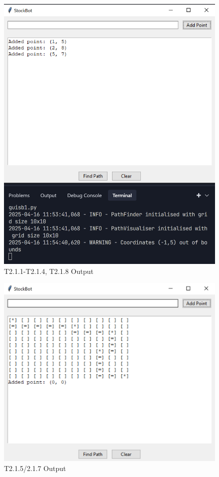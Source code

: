 \begin{figure}[htbp!]
	\centering
	\includegraphics[width=1\linewidth]{Images/sprintbtest1.png}
	\caption{T2.1.1-T2.1.4, T2.1.8 Output}
\end{figure}

\begin{figure}[htbp!]
	\centering
	\includegraphics[width=1\linewidth]{Images/sprintbtest2.png}
	\caption{T2.1.5/2.1.7 Output}
\end{figure}

